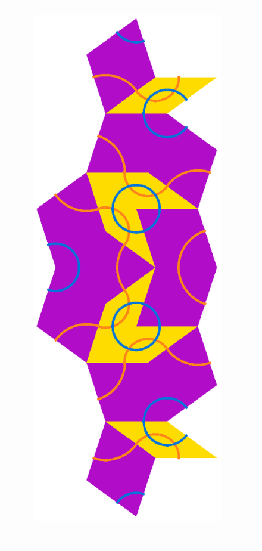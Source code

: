 \documentclass[
  oneside,
  11pt, a4paper,
  footinclude=true,
  headinclude=true,
  cleardoublepage=empty
]{scrbook}
\begin{document}
\begin{figure}[H]
\begin{tabular}{cc}
\begin{subfigure}[b]{0.4\textwidth}
             \centering
             \includegraphics[scale=0.4]{SkinnyInflation3}
             \end{subfigure}   \\
             \begin{subfigure}[b]{0.4\textwidth}

\end{subfigure}
\end{tabular}
\end{figure}
\end{document}
